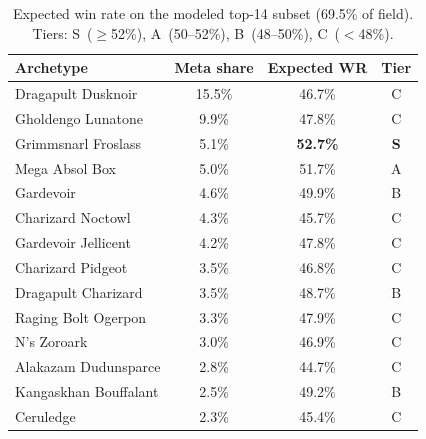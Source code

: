 \documentclass[journal]{IEEEtran}
\begin{document}
\begin{table}[!t]
\centering
\caption{Expected win rate on the modeled top-14 subset (69.5\% of field). Tiers: S~($\geq$52\%), A~(50--52\%), B~(48--50\%), C~($<$48\%).}
\label{tab:expected}
\begin{tabular}{lccc}
\toprule
\textbf{Archetype} & \textbf{Meta share} & \textbf{Expected WR} & \textbf{Tier} \\
\midrule
Dragapult Dusknoir & 15.5\% & 46.7\% & C \\
Gholdengo Lunatone & 9.9\% & 47.8\% & C \\
Grimmsnarl Froslass & 5.1\% & \textbf{52.7\%} & \textbf{S} \\
Mega Absol Box & 5.0\% & 51.7\% & A \\
Gardevoir & 4.6\% & 49.9\% & B \\
Charizard Noctowl & 4.3\% & 45.7\% & C \\
Gardevoir Jellicent & 4.2\% & 47.8\% & C \\
Charizard Pidgeot & 3.5\% & 46.8\% & C \\
Dragapult Charizard & 3.5\% & 48.7\% & B \\
Raging Bolt Ogerpon & 3.3\% & 47.9\% & C \\
N's Zoroark & 3.0\% & 46.9\% & C \\
Alakazam Dudunsparce & 2.8\% & 44.7\% & C \\
Kangaskhan Bouffalant & 2.5\% & 49.2\% & B \\
Ceruledge & 2.3\% & 45.4\% & C \\
\bottomrule
\end{tabular}
\end{table}
\end{document}
